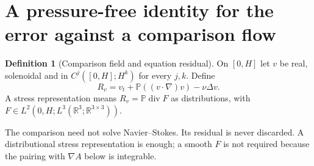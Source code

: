 \documentclass[11pt,a4paper]{article}
\theoremstyle{definition}\newtheorem{definition}[theorem]{Definition}
\theoremstyle{remark}\newtheorem{remark}[theorem]{Remark}
\newcommand{\R}{\mathbb R}
\newcommand{\PP}{\mathbb P}
\newcommand{\diver}{\operatorname{div}}
\numberwithin{equation}{section}
\begin{document}
\section{A pressure-free identity for the error against a comparison flow}
\label{sec:relative}
\begin{definition}[Comparison field and equation residual]\label{def:comparison}
On $[0,H]$ let $v$ be real, solenoidal and in $C^j([0,H];H^k)$ for every $j,k$. Define
\begin{equation}\label{eq:residual}
 R_v=v_t+\PP((v\cdot\nabla)v)-\nu\Delta v.
\end{equation}
A stress representation means $R_v=\PP\diver F$ as distributions, with $F\in L^2(0,H;L^3(\R^3;\R^{3\times3}))$.
\end{definition}
The comparison need not solve Navier--Stokes. Its residual is never discarded. A distributional stress representation is enough; a smooth $F$ is not required because the pairing with $\nabla A$ below is integrable.
\end{document}
